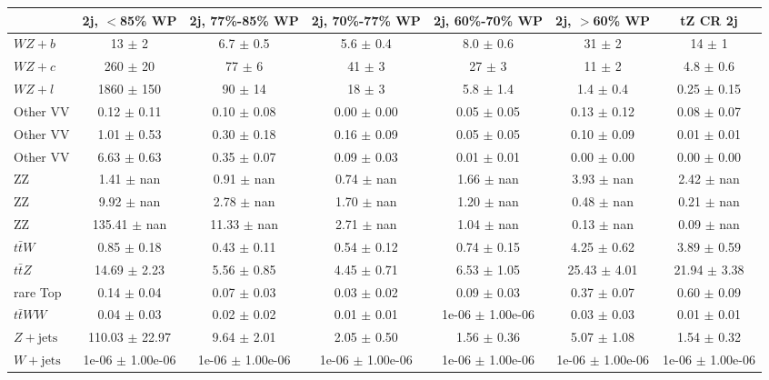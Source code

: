 \begin{tabular}{|l|S|S|S|S|S|S|}
\hline 
 & {2j, $<$85\% WP} & {2j, 77\%-85\% WP} & {2j, 70\%-77\% WP} & {2j, 60\%-70\% WP} & {2j, $>$60\% WP} & {tZ CR 2j}\\
\hline 
  $WZ + b$   & 13 $\pm$ 2 & 6.7 $\pm$ 0.5 & 5.6 $\pm$ 0.4 & 8.0 $\pm$ 0.6 & 31 $\pm$ 2 & 14 $\pm$ 1 \\ 
  $WZ + c$   & 260 $\pm$ 20 & 77 $\pm$ 6 & 41 $\pm$ 3 & 27 $\pm$ 3 & 11 $\pm$ 2 & 4.8 $\pm$ 0.6 \\ 
  $WZ + l$   & 1860 $\pm$ 150 & 90 $\pm$ 14 & 18 $\pm$ 3 & 5.8 $\pm$ 1.4 & 1.4 $\pm$ 0.4 & 0.25 $\pm$ 0.15 \\ 
  Other VV   & 0.12 $\pm$ 0.11 & 0.10 $\pm$ 0.08 & 0.00 $\pm$ 0.00 & 0.05 $\pm$ 0.05 & 0.13 $\pm$ 0.12 & 0.08 $\pm$ 0.07 \\ 
  Other VV   & 1.01 $\pm$ 0.53 & 0.30 $\pm$ 0.18 & 0.16 $\pm$ 0.09 & 0.05 $\pm$ 0.05 & 0.10 $\pm$ 0.09 & 0.01 $\pm$ 0.01 \\ 
  Other VV   & 6.63 $\pm$ 0.63 & 0.35 $\pm$ 0.07 & 0.09 $\pm$ 0.03 & 0.01 $\pm$ 0.01 & 0.00 $\pm$ 0.00 & 0.00 $\pm$ 0.00 \\ 
  ZZ   & 1.41 $\pm$ nan & 0.91 $\pm$ nan & 0.74 $\pm$ nan & 1.66 $\pm$ nan & 3.93 $\pm$ nan & 2.42 $\pm$ nan \\ 
  ZZ   & 9.92 $\pm$ nan & 2.78 $\pm$ nan & 1.70 $\pm$ nan & 1.20 $\pm$ nan & 0.48 $\pm$ nan & 0.21 $\pm$ nan \\ 
  ZZ   & 135.41 $\pm$ nan & 11.33 $\pm$ nan & 2.71 $\pm$ nan & 1.04 $\pm$ nan & 0.13 $\pm$ nan & 0.09 $\pm$ nan \\ 
  $t\bar{t}W$   & 0.85 $\pm$ 0.18 & 0.43 $\pm$ 0.11 & 0.54 $\pm$ 0.12 & 0.74 $\pm$ 0.15 & 4.25 $\pm$ 0.62 & 3.89 $\pm$ 0.59 \\ 
  $t\bar{t}Z$   & 14.69 $\pm$ 2.23 & 5.56 $\pm$ 0.85 & 4.45 $\pm$ 0.71 & 6.53 $\pm$ 1.05 & 25.43 $\pm$ 4.01 & 21.94 $\pm$ 3.38 \\ 
  rare Top   & 0.14 $\pm$ 0.04 & 0.07 $\pm$ 0.03 & 0.03 $\pm$ 0.02 & 0.09 $\pm$ 0.03 & 0.37 $\pm$ 0.07 & 0.60 $\pm$ 0.09 \\ 
  $t\bar{t}WW$   & 0.04 $\pm$ 0.03 & 0.02 $\pm$ 0.02 & 0.01 $\pm$ 0.01 & 1e-06 $\pm$ 1.00e-06 & 0.03 $\pm$ 0.03 & 0.01 $\pm$ 0.01 \\ 
  $Z+\text{jets}$   & 110.03 $\pm$ 22.97 & 9.64 $\pm$ 2.01 & 2.05 $\pm$ 0.50 & 1.56 $\pm$ 0.36 & 5.07 $\pm$ 1.08 & 1.54 $\pm$ 0.32 \\ 
  $W+\text{jets}$   & 1e-06 $\pm$ 1.00e-06 & 1e-06 $\pm$ 1.00e-06 & 1e-06 $\pm$ 1.00e-06 & 1e-06 $\pm$ 1.00e-06 & 1e-06 $\pm$ 1.00e-06 & 1e-06 $\pm$ 1.00e-06 \\ 

\end{tabular}

